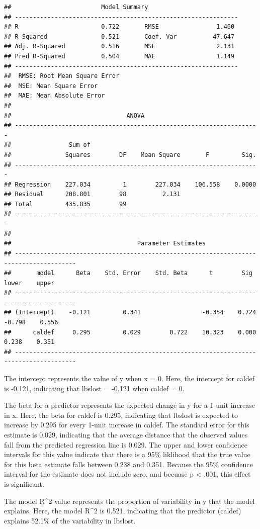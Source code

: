 \documentclass[]{article}
\begin{document}
\begin{verbatim}
##                         Model Summary                          
## --------------------------------------------------------------
## R                       0.722       RMSE                1.460 
## R-Squared               0.521       Coef. Var          47.647 
## Adj. R-Squared          0.516       MSE                 2.131 
## Pred R-Squared          0.504       MAE                 1.149 
## --------------------------------------------------------------
##  RMSE: Root Mean Square Error 
##  MSE: Mean Square Error 
##  MAE: Mean Absolute Error 
## 
##                                ANOVA                                 
## --------------------------------------------------------------------
##                Sum of                                               
##               Squares        DF    Mean Square       F         Sig. 
## --------------------------------------------------------------------
## Regression    227.034         1        227.034    106.558    0.0000 
## Residual      208.801        98          2.131                      
## Total         435.835        99                                     
## --------------------------------------------------------------------
## 
##                                   Parameter Estimates                                   
## ---------------------------------------------------------------------------------------
##       model      Beta    Std. Error    Std. Beta      t        Sig      lower    upper 
## ---------------------------------------------------------------------------------------
## (Intercept)    -0.121         0.341                 -0.354    0.724    -0.798    0.556 
##      caldef     0.295         0.029        0.722    10.323    0.000     0.238    0.351 
## ---------------------------------------------------------------------------------------
\end{verbatim}

The intercept represents the value of y when x = 0. Here, the intercept
for caldef is -0.121, indicating that lbslost = -0.121 when caldef = 0.

The beta for a predictor represents the expected change in y for a
1-unit increase in x. Here, the beta for caldef is 0.295, indicating
that lbslost is expected to increase by 0.295 for every 1-unit increase
in caldef. The standard error for this estimate is 0.029, indicating
that the average distance that the observed values fall from the
predicted regression line is 0.029. The upper and lower confidence
intervals for this value indicate that there is a 95\% liklihood that
the true value for this beta estimate falls between 0.238 and 0.351.
Because the 95\% confidence interval for the estimate does not include
zero, and becuase p \textless{} .001, this effect is significant.

The model R\^{}2 value represents the proportion of variability in y
that the model explains. Here, the model R\^{}2 is 0.521, indicating
that the predictor (caldef) explains 52.1\% of the variability in
lbslost.
\end{document}
